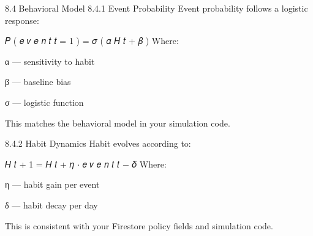 8.4 Behavioral Model
8.4.1 Event Probability
Event probability follows a logistic response:

𝑃
(
𝑒
𝑣
𝑒
𝑛
𝑡
𝑡
=
1
)
=
𝜎
(
𝛼
𝐻
𝑡
+
𝛽
)
Where:

α — sensitivity to habit

β — baseline bias

σ — logistic function

This matches the behavioral model in your simulation code.

8.4.2 Habit Dynamics
Habit evolves according to:

𝐻
𝑡
+
1
=
𝐻
𝑡
+
𝜂
⋅
𝑒
𝑣
𝑒
𝑛
𝑡
𝑡
−
𝛿
Where:

η — habit gain per event

δ — habit decay per day

This is consistent with your Firestore policy fields and simulation code.

